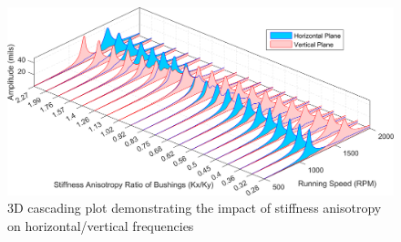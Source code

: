 		\begin{figure}[H]
			\centering
			\includegraphics[width=.75\linewidth]{./figures/Images/Figure_6}
			\caption{3D cascading plot demonstrating the impact of stiffness anisotropy on horizontal/vertical frequencies}
			\label{fig:Figure_6}
		\end{figure}

